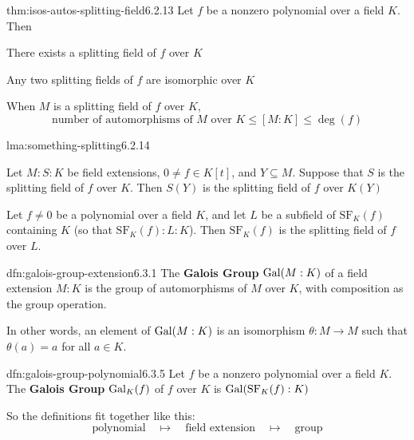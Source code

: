 \documentclass[landscape, 8pt]{extarticle}
\begin{document}
\begin{multicols}{3}
\begin{thm}{thm:isos-autos-splitting-field}{6.2.13}
    Let $f$ be a nonzero polynomial over a field $K$. Then
    \begin{enumerate-zero}
        \item There exists a splitting field of $f$ over $K$
        \item Any two splitting fields of $f$ are isomorphic over $K$
        \item When $M$ is a splitting field of $f$ over $K$,
            \[\text{number of automorphisms of $M$ over $K$}\le [M : K] \le \deg(f)\]
    \end{enumerate-zero}
\end{thm}

\begin{lma}[]{lma:something-splitting}{6.2.14}
    \begin{enumerate-tight}
        \item Let $M : S : K$ be field extensions, $0 \ne f \in K[t]$, and $Y \subseteq M$. Suppose that $S$ is the splitting field of $f$ over $K$. Then $S(Y)$ is the splitting field of $f$ over $K(Y)$
        \item Let $f\ne 0$ be a polynomial over a field $K$, and let $L$ be a subfield of $\mathrm{SF}_{K}(f)$ containing $K$ (so that $\mathrm{SF}_{K}(f) : L : K$). Then $\mathrm{SF}_{K}(f)$ is the splitting field of $f$ over $L$.
    \end{enumerate-tight}
\end{lma}

\begin{dfn}{dfn:galois-group-extension}{6.3.1}
    The \textbf{Galois Group} $\operatorname{Gal}(M : K)$ of a field extension $M : K$ is the group of automorphisms of $M$ over $K$, with composition as the group operation.

    In other words, an element of $\operatorname{Gal}(M : K)$ is an isomorphism $\theta : M \to M$ such that $\theta(a) = a$ for all $a\in K$.
\end{dfn}

\begin{dfn}{dfn:galois-group-polynomial}{6.3.5}
    Let $f$ be a nonzero polynomial over a field $K$. The \textbf{Galois Group} $\operatorname{Gal}_{K}(f)$ of $f$ over $K$ is $\operatorname{Gal}(\mathrm{SF}_{K}(f) : K)$

    So the definitions fit together like this:
    \[\text{polynomial} \quad \longmapsto\quad \text{field extension}\quad\longmapsto\quad\text{group}\]
\end{dfn}


\end{multicols}
\end{document}
